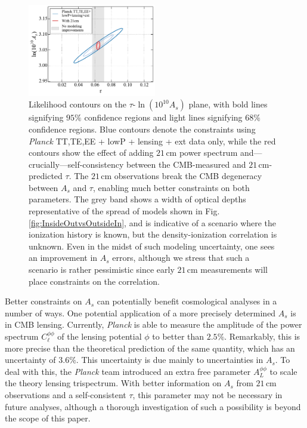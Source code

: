 \documentclass[twocolumn,aps,prd,nofootinbib,showpacs]{revtex4-1}
\begin{document}
\begin{figure}[!]
\centering
\includegraphics[width=0.5\textwidth]{figures/AsTau_w21cm.pdf}
\caption{Likelihood contours on the $\tau$-$\ln (10^{10} A_s)$ plane, with bold lines signifying $95\%$ confidence regions and light lines signifying $68\%$ confidence regions. Blue contours denote the constraints using \emph{Planck} TT,TE,EE + lowP + lensing + ext data only, while the red contours show the effect of adding $21\,\textrm{cm}$ power spectrum and---crucially---self-consistency between the CMB-measured and $21\,\textrm{cm}$-predicted $\tau$. The $21\,\textrm{cm}$ observations break the CMB degeneracy between $A_s$ and $\tau$, enabling much better constraints on both parameters. The grey band shows a width of optical depths representative of the spread of models shown in Fig. \ref{fig:InsideOutvsOutsideIn}, and is indicative of a scenario where the ionization history is known, but the density-ionization correlation is unknown. Even in the midst of such modeling uncertainty, one sees an improvement in $A_s$ errors, although we stress that such a scenario is rather pessimistic since early $21\,\textrm{cm}$ measurements will place constraints on the correlation.}
\label{fig:AsTau_w21cm}
\end{figure}

Better constraints on $A_s$ can potentially benefit cosmological analyses in a number of ways. One potential application of a more precisely determined $A_s$ is in CMB lensing. Currently, \emph{Planck} is able to measure the amplitude of the power spectrum $C_\ell^{\phi \phi}$ of the lensing potential $\phi$ to better than $2.5\%$. Remarkably, this is more precise than the theoretical prediction of the same quantity, which has an uncertainty of $3.6\%$. This uncertainty is due mainly to uncertainties in $A_s$. To deal with this, the \emph{Planck} team introduced an extra free parameter $A_L^{\phi \phi}$ to scale the theory lensing trispectrum. With better information on $A_s$ from $21\,\textrm{cm}$ observations and a self-consistent $\tau$, this parameter may not be necessary in future analyses, although a thorough investigation of such a possibility is beyond the scope of this paper.
\end{document}
